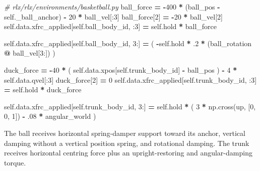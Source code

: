 \documentclass[
  american,
  11pt,
  letterpaper,
]{article}
\newenvironment{Shaded}{\begin{snugshade}}{\end{snugshade}}
\newcommand{\CommentTok}[1]{\textcolor[rgb]{0.56,0.35,0.01}{\textit{#1}}}
\newcommand{\DecValTok}[1]{\textcolor[rgb]{0.00,0.00,0.81}{#1}}
\newcommand{\FloatTok}[1]{\textcolor[rgb]{0.00,0.00,0.81}{#1}}
\newcommand{\NormalTok}[1]{#1}
\newcommand{\OperatorTok}[1]{\textcolor[rgb]{0.81,0.36,0.00}{\textbf{#1}}}
\newcommand{\VariableTok}[1]{\textcolor[rgb]{0.00,0.00,0.00}{#1}}
\renewenvironment{Shaded}{\par\smallskip}{\par\smallskip}
\begin{document}
\begin{Shaded}
\begin{Highlighting}[]
\CommentTok{\# rlx/rlx/environments/basketball.py}
\NormalTok{ball\_force }\OperatorTok{=} \OperatorTok{{-}}\DecValTok{400} \OperatorTok{*}\NormalTok{ (ball\_pos }\OperatorTok{{-}} \VariableTok{self}\NormalTok{.\_ball\_anchor) }\OperatorTok{{-}} \DecValTok{20} \OperatorTok{*}\NormalTok{ ball\_vel[:}\DecValTok{3}\NormalTok{]}
\NormalTok{ball\_force[}\DecValTok{2}\NormalTok{] }\OperatorTok{=} \OperatorTok{{-}}\DecValTok{20} \OperatorTok{*}\NormalTok{ ball\_vel[}\DecValTok{2}\NormalTok{]}
\VariableTok{self}\NormalTok{.data.xfrc\_applied[}\VariableTok{self}\NormalTok{.ball\_body\_id, :}\DecValTok{3}\NormalTok{] }\OperatorTok{=} \VariableTok{self}\NormalTok{.hold }\OperatorTok{*}\NormalTok{ ball\_force}

\VariableTok{self}\NormalTok{.data.xfrc\_applied[}\VariableTok{self}\NormalTok{.ball\_body\_id, }\DecValTok{3}\NormalTok{:] }\OperatorTok{=}\NormalTok{ (}
    \OperatorTok{{-}}\VariableTok{self}\NormalTok{.hold }\OperatorTok{*} \FloatTok{.2} \OperatorTok{*}\NormalTok{ (ball\_rotation }\OperatorTok{@}\NormalTok{ ball\_vel[}\DecValTok{3}\NormalTok{:])}
\NormalTok{)}

\NormalTok{duck\_force }\OperatorTok{=} \OperatorTok{{-}}\DecValTok{40} \OperatorTok{*}\NormalTok{ (}
    \VariableTok{self}\NormalTok{.data.xpos[}\VariableTok{self}\NormalTok{.trunk\_body\_id] }\OperatorTok{{-}}\NormalTok{ ball\_pos}
\NormalTok{) }\OperatorTok{{-}} \DecValTok{4} \OperatorTok{*} \VariableTok{self}\NormalTok{.data.qvel[:}\DecValTok{3}\NormalTok{]}
\NormalTok{duck\_force[}\DecValTok{2}\NormalTok{] }\OperatorTok{=} \DecValTok{0}
\VariableTok{self}\NormalTok{.data.xfrc\_applied[}\VariableTok{self}\NormalTok{.trunk\_body\_id, :}\DecValTok{3}\NormalTok{] }\OperatorTok{=} \VariableTok{self}\NormalTok{.hold }\OperatorTok{*}\NormalTok{ duck\_force}

\VariableTok{self}\NormalTok{.data.xfrc\_applied[}\VariableTok{self}\NormalTok{.trunk\_body\_id, }\DecValTok{3}\NormalTok{:] }\OperatorTok{=} \VariableTok{self}\NormalTok{.hold }\OperatorTok{*}\NormalTok{ (}
    \DecValTok{3} \OperatorTok{*}\NormalTok{ np.cross(up, [}\DecValTok{0}\NormalTok{, }\DecValTok{0}\NormalTok{, }\DecValTok{1}\NormalTok{]) }\OperatorTok{{-}} \FloatTok{.08} \OperatorTok{*}\NormalTok{ angular\_world}
\NormalTok{)}
\end{Highlighting}
\end{Shaded}

The ball receives horizontal spring-damper support toward its anchor,
vertical damping without a vertical position spring, and rotational
damping. The trunk receives horizontal centring force plus an
upright-restoring and angular-damping torque.
\end{document}
